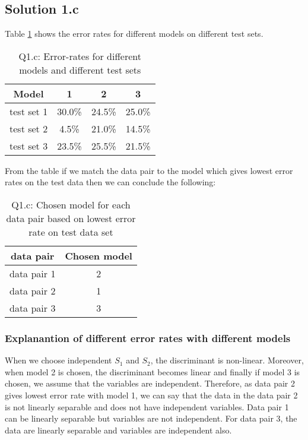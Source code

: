 \subsection*{Solution 1.c}
Table \ref{tbl:multi_gauss_1c} shows the error rates for different models on different test sets.
\begin{table}[!h]
	\begin{center}
		\begin{tabular}{||c | c | c | c||} 
			\hline
			Model & 1 & 2 & 3 \\ [0.5ex] 
			\hline\hline
			test set 1 & 30.0\% & 24.5\% &25.0\% \\
			\hline
			test set 2 & 4.5\% &21.0\% & 14.5\% \\
			\hline
			test set 3 & 23.5\% & 25.5\% &21.5\% \\ [1ex]
			\hline
		\end{tabular}
		\caption{Q1.c: Error-rates for different models and different test sets}
		\label{tbl:multi_gauss_1c}
	\end{center}
\end{table}
\newline
From the table if we match the data pair to the model which gives lowest error rates on the test data then we can conclude the following:
\begin{table}[!h]
	\begin{center}
		\begin{tabular}{||c | c ||} 
			\hline
			data pair & Chosen model \\ [0.5ex] 
			\hline\hline
			data pair 1 & 2 \\
			\hline
			data pair 2 & 1 \\
			\hline
			data pair 3 & 3 \\ [1ex]
			\hline
		\end{tabular}
		\caption{Q1.c: Chosen model for each data pair based on lowest error rate on test data set}
		\label{tbl:chosen_model_1c}
	\end{center}
\end{table}
\subsubsection*{Explanantion of different error rates with different models}
When we choose independent $S_1$ and $S_2$, the discriminant is non-linear. Moreover, when model 2 is chosen, the discriminant becomes linear and finally if model 3 is chosen, we assume that the variables are independent. Therefore, as data pair 2 gives lowest error rate with model 1, we can say that the data in the data pair 2 is not linearly separable and does not have independent variables. Data pair 1 can be linearly separable but variables are not independent. For data pair 3, the data are linearly separable and variables are independent also.
